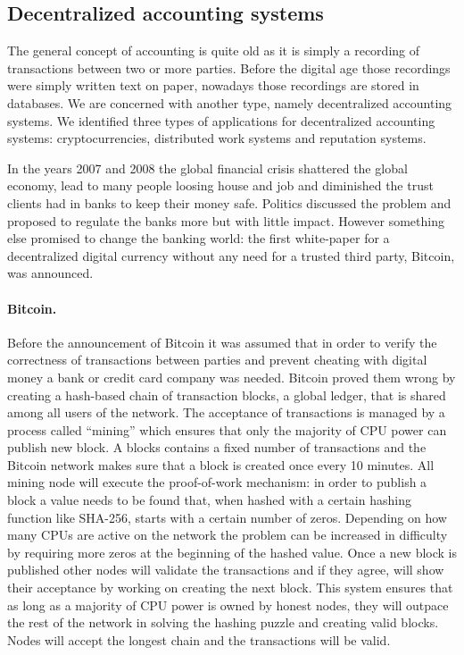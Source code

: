 \subsection{Decentralized accounting systems}
The general concept of accounting is quite old as it is simply a recording of transactions between
two or more parties. Before the digital age those recordings were simply written text on paper, 
nowadays those recordings are stored in databases. We are concerned with another type, namely 
decentralized accounting systems. We identified three types of applications for decentralized 
accounting systems: cryptocurrencies, distributed work systems and reputation systems. 

In the years 2007 and 2008 the global financial crisis shattered the global economy, lead to many
people loosing house and job and diminished the trust clients had in banks to keep their money safe.
Politics discussed the problem and proposed to regulate the banks more but with little impact. 
However something else promised to change the banking world: the first white-paper for a 
decentralized digital currency without any need for a trusted third party, Bitcoin, was announced. 

\paragraph{Bitcoin.}
Before the announcement of Bitcoin it was assumed that in order to verify the correctness of 
transactions between parties and prevent cheating with digital money a bank or credit card company
was needed. Bitcoin proved them wrong by creating a hash-based chain of transaction blocks, a global 
ledger, that is shared among all users of the network. The acceptance of transactions is managed by 
a process called ``mining'' which ensures that only the majority of CPU power can publish new 
block. A blocks contains a fixed number of transactions and the Bitcoin network makes sure that a
block is created once every 10 minutes. All mining node will execute the proof-of-work mechanism: 
in order to publish a block a value needs to be found that, when hashed with a certain hashing 
function like SHA-256, starts with a certain number of zeros. Depending on how many CPUs are active
on the network the problem can be increased in difficulty by requiring more zeros at the beginning 
of the hashed value. Once a new block is published other nodes will validate the transactions and 
if they agree, will show their acceptance by working on creating the next block. This system ensures
that as long as a majority of CPU power is owned by honest nodes, they will outpace the rest of the
network in solving the hashing puzzle and creating valid blocks. Nodes will accept the longest chain
and the transactions will be valid.

